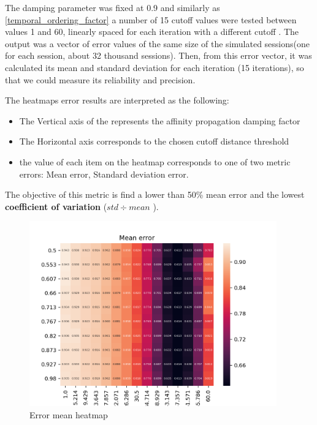 \documentclass[ecp,tc,english]{iiufrgs}
\begin{document}
        The damping parameter was fixed at 0.9 and similarly as \ref{temporal_ordering_factor} a number of 15 cutoff values were tested between values 1 and 60, linearly spaced for each iteration with a different cutoff . The output was a vector of error values of the same size of the simulated sessions(one for each session, about 32 thousand sessions).
        Then, from this error vector, it was calculated its mean and standard deviation for each iteration (15 iterations), so that we could measure its reliability and precision.
        
        

    
        The heatmaps error results are interpreted as the following:
        \begin{itemize}
            \item The Vertical axis of the represents the affinity propagation damping factor
            \item The Horizontal axis corresponds to the chosen cutoff distance threshold
            \item the value of each item on the heatmap corresponds to one of two metric errors: Mean error, Standard deviation error.
        \end{itemize}
    
        The objective of this metric is find a lower than 50\% mean error and the lowest \textbf{coefficient of variation} (\(std \div mean\) ). 
        
        \begin{figure}[H]
            \centering
            \includegraphics[width=0.95\textwidth]{images/error_mean.png}
            \caption{Error mean heatmap}
            \label{fig:error_mean_heatmap}
        \end{figure}
        
\end{document}
